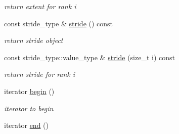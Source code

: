 \begin{DoxyCompactItemize}
\begin{DoxyCompactList}\small\item\em return extent for rank i \item\end{DoxyCompactList}\item 
\hypertarget{classbtas_1_1_tensor_wrapper_3_01_t_01_5_00_01_n_00_01_order_01_4_a543b2039c43c365d08ca678444695782}{
const stride\_\-type \& \hyperlink{classbtas_1_1_tensor_wrapper_3_01_t_01_5_00_01_n_00_01_order_01_4_a543b2039c43c365d08ca678444695782}{stride} () const }
\label{classbtas_1_1_tensor_wrapper_3_01_t_01_5_00_01_n_00_01_order_01_4_a543b2039c43c365d08ca678444695782}

\begin{DoxyCompactList}\small\item\em return stride object \item\end{DoxyCompactList}\item 
\hypertarget{classbtas_1_1_tensor_wrapper_3_01_t_01_5_00_01_n_00_01_order_01_4_a112b4d2a1a92325bfa1892b015c52570}{
const stride\_\-type::value\_\-type \& \hyperlink{classbtas_1_1_tensor_wrapper_3_01_t_01_5_00_01_n_00_01_order_01_4_a112b4d2a1a92325bfa1892b015c52570}{stride} (size\_\-t i) const }
\label{classbtas_1_1_tensor_wrapper_3_01_t_01_5_00_01_n_00_01_order_01_4_a112b4d2a1a92325bfa1892b015c52570}

\begin{DoxyCompactList}\small\item\em return stride for rank i \item\end{DoxyCompactList}\item 
\hypertarget{classbtas_1_1_tensor_wrapper_3_01_t_01_5_00_01_n_00_01_order_01_4_a7137d636d2e0481f6a423a25346c033e}{
iterator \hyperlink{classbtas_1_1_tensor_wrapper_3_01_t_01_5_00_01_n_00_01_order_01_4_a7137d636d2e0481f6a423a25346c033e}{begin} ()}
\label{classbtas_1_1_tensor_wrapper_3_01_t_01_5_00_01_n_00_01_order_01_4_a7137d636d2e0481f6a423a25346c033e}

\begin{DoxyCompactList}\small\item\em iterator to begin \item\end{DoxyCompactList}\item 
\hypertarget{classbtas_1_1_tensor_wrapper_3_01_t_01_5_00_01_n_00_01_order_01_4_a0195cf9477e3ad0cbc1dca71c891775f}{
iterator \hyperlink{classbtas_1_1_tensor_wrapper_3_01_t_01_5_00_01_n_00_01_order_01_4_a0195cf9477e3ad0cbc1dca71c891775f}{end} ()}
\label{classbtas_1_1_tensor_wrapper_3_01_t_01_5_00_01_n_00_01_order_01_4_a0195cf9477e3ad0cbc1dca71c891775f}


\end{DoxyCompactItemize}
